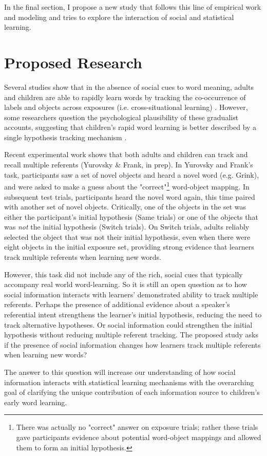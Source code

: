 \documentclass[man]{apa2}
\begin{document}
In the final section, I propose a new study that follows this line of empirical work and modeling\cite{johnson2012exploiting,frank2009using,yu2007unified,hollich2000breaking} and tries to explore the interaction of social and statistical learning.

\section{Proposed Research}

Several studies show that in the absence of social cues to word meaning, adults and children are able to rapidly learn words by tracking the co-occurrence of labels and objects across exposures (i.e. cross-situational learning) \cite{smith2008infants,vouloumanos2008fine}. However, some researchers question the psychological plausibility of these gradualist accounts, suggesting that children's rapid word learning is better described by a single hypothesis tracking mechanism \cite{trueswell2013propose,medina2011words}. 

Recent experimental work shows that both adults and children can track and recall 
multiple referents (Yurovsky & Frank, in prep). In Yurovsky and Frank's task, participants saw a set of novel objects and heard a novel word (e.g. Grink), and were asked to make a guess about the "correct"\footnote{There was actually no "correct" answer on exposure trials; rather these trials gave participants evidence about potential word-object mappings and allowed them to form an initial hypothesis.} word-object mapping. In subsequent test trials, participants heard the novel word again, this time paired with another set of novel objects. Critically, one of the objects in the set was either the participant's initial hypothesis (Same trials) or one of the objects that was \emph{not} the initial hypothesis (Switch trials). On Switch trials, adults reliably selected the object that was not their initial hypothesis, even when there were eight objects in the initial exposure set, providing strong evidence that learners track multiple referents when learning new words. 

However, this task did not include any of the rich, social cues that typically accompany real world 
word-learning. So it is still an open question as to how social information interacts with learners' 
demonstrated ability to track multiple referents. Perhaps the presence of additional evidence about 
a speaker's referential intent strengthens the learner's initial hypothesis, reducing the need to track 
alternative hypotheses. Or social information could strengthen the initial hypothesis 
without reducing multiple referent tracking. The proposed study asks if the presence of social information changes how learners track multiple referents when learning new words?

The answer to this question will increase our understanding of how social information interacts with statistical learning mechanisms with the overarching goal of clarifying the unique contribution of each information source to children's early word learning. 



\end{document}
